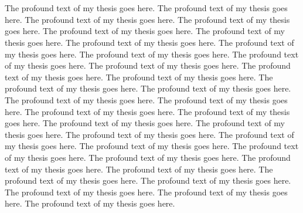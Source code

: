 \chapter{}\label{ch:two}

The profound text of my thesis goes here. The profound text of my thesis
goes here. The profound text of my thesis goes here. The profound text of my
thesis goes here. The profound text of my thesis goes here. The profound
text of my thesis goes here. The profound text of my thesis goes here. The
profound text of my thesis goes here. The profound text of my thesis goes
here. The profound text of my thesis goes here. The profound text of my
thesis goes here. The profound text of my thesis goes here. The profound
text of my thesis goes here. The profound text of my thesis goes here. The
profound text of my thesis goes here. The profound text of my thesis goes
here. The profound text of my thesis goes here. The profound text of my
thesis goes here. The profound text of my thesis goes here. The profound
text of my thesis goes here. The profound text of my thesis goes here. The
profound text of my thesis goes here. The profound text of my thesis goes
here. The profound text of my thesis goes here. The profound text of my
thesis goes here. The profound text of my thesis goes here. The profound
text of my thesis goes here. The profound text of my thesis goes here. The
profound text of my thesis goes here. The profound text of my thesis goes
here. The profound text of my thesis goes here. The profound text of my
thesis goes here. The profound text of my thesis goes here.

